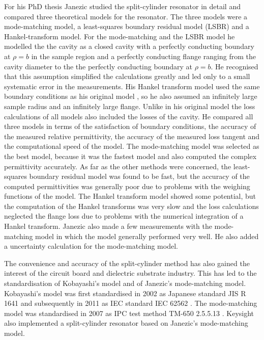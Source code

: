 For his PhD thesis Janezic \cite{janezic} studied the split-cylinder resonator in detail and compared three theoretical models for the resonator. The three models were a mode-matching model, a least-squares boundary residual model (LSBR) and a Hankel-transform model. For the mode-matching and the LSBR model he modelled the the cavity as a closed cavity with a perfectly conducting boundary at $\rho=b$ in the sample region and a perfectly conducting flange ranging from the cavity diameter to the the perfectly conducting boundary at $\rho=b$. He recognised that this assumption simplified the calculations greatly and led only to a small systematic error in the measurements. His Hankel transform model used the same boundary conditions as his original model \cite{janezic1999}, so he also assumed an infinitely large sample radius and an infinitely large flange. Unlike in his original model the loss calculations of all models also included the losses of the cavity. He compared all three models in terms of the satisfaction of boundary conditions, the accuracy of the measured relative permittivity, the accuracy of the measured loss tangent and the computational speed of the model. The mode-matching model was selected as the best model, because it was the fastest model and also computed the complex permittivity accurately. As far as the other methods were concerned, the least-squares boundary residual model was found to be fast, but the accuracy of the computed permittivities was generally poor due to problems with the weighing functions of the model. The Hankel transform model showed some potential, but the computation of the Hankel transforms was very slow and the loss calculations neglected the flange loss due to problems with the numerical integration of a Hankel transform. Janezic also made a few measurements with the mode-matching model in which the model generally performed very well. He also added a uncertainty calculation for the mode-matching model.

The convenience and accuracy of the split-cylinder method has also gained the interest of the circuit board and dielectric substrate industry. This has led to the standardisation of Kobayashi's model and of Janezic's mode-matching model. Kobayashi's model was first standardised in 2002 as Japanese standard JIS R 1641 \cite{kobayashistandard} and subsequently in 2011 as IEC standard IEC 62562 \cite{iecSC}. The mode-matching model was standardised in 2007 as IPC test method TM-650 2.5.5.13 \cite{ipcSC}. Keysight \cite{keysightSC} also implemented a split-cylinder resonator based on Janezic's mode-matching model.

